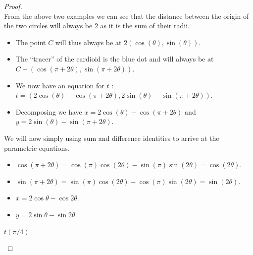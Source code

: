 \documentclass[12pt]{article}
\theoremstyle{plain}
\begin{document}
\begin{proof}
  \ \\

  From the above two examples we can see that the distance between the origin of the two circles will always be $ 2 $ as it is the sum of their radii.

  \begin{itemize}
    \item The point $ C $ will thus always be at $ 2 (\cos(\theta), \sin(\theta)) $.
    \item The ``tracer'' of the cardioid is the blue dot and will always be at $ C - (\cos(\pi + 2\theta), \sin(\pi + 2\theta)) $.
    \item We now have an equation for $ t $ : $ t = (2\cos(\theta) - \cos(\pi + 2\theta), 2\sin(\theta) - \sin(\pi + 2\theta)) $.
    \item Decomposing we have $ x = 2\cos(\theta) - \cos(\pi + 2\theta) $ and $ y = 2\sin(\theta) - \sin(\pi + 2\theta) $.
  \end{itemize}
    We will now simply using sum and difference identities to arrive at the parametric equations.
    \begin{itemize}
    \item $ \cos(\pi + 2\theta) = \cos(\pi)\cos(2\theta) - \sin(\pi)\sin(2\theta) = \cos(2\theta) $.
    \item $ \sin(\pi + 2\theta) = \sin(\pi)\cos(2\theta) - \cos(\pi)\sin(2\theta) = \sin(2\theta) $.
    \item $ x = 2\cos\theta - \cos2\theta $.
    \item $ y = 2\sin\theta - \sin2\theta $.
  \end{itemize}

  \begin{center}

    $ t(\pi/4) $
  \end{center}

\end{proof}
\end{document}
